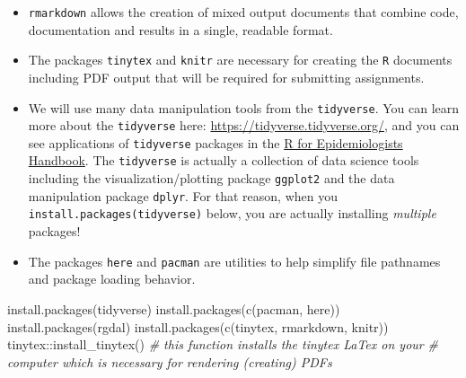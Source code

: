 \documentclass[
]{book}
\newenvironment{Shaded}{\begin{snugshade}}{\end{snugshade}}
\newcommand{\CommentTok}[1]{\textcolor[rgb]{0.56,0.35,0.01}{\textit{#1}}}
\newcommand{\FunctionTok}[1]{\textcolor[rgb]{0.00,0.00,0.00}{#1}}
\newcommand{\NormalTok}[1]{#1}
\newcommand{\SpecialCharTok}[1]{\textcolor[rgb]{0.00,0.00,0.00}{#1}}
\newcommand{\StringTok}[1]{\textcolor[rgb]{0.31,0.60,0.02}{#1}}
\providecommand{\tightlist}{%
  \setlength{\itemsep}{0pt}\setlength{\parskip}{0pt}}
\begin{document}
\begin{itemize}
\tightlist
\item
  \texttt{rmarkdown} allows the creation of mixed output documents that combine code, documentation and results in a single, readable format.
\item
  The packages \texttt{tinytex} and \texttt{knitr} are necessary for creating the \texttt{R} documents including PDF output that will be required for submitting assignments.
\item
  We will use many data manipulation tools from the \texttt{tidyverse}. You can learn more about the \texttt{tidyverse} here: \url{https://tidyverse.tidyverse.org/}, and you can see applications of \texttt{tidyverse} packages in the \href{https://epirhandbook.com/index.html}{R for Epidemiologists Handbook}. The \texttt{tidyverse} is actually a collection of data science tools including the visualization/plotting package \texttt{ggplot2} and the data manipulation package \texttt{dplyr}. For that reason, when you \texttt{install.packages(\textquotesingle{}tidyverse\textquotesingle{})} below, you are actually installing \emph{multiple} packages!
\item
  The packages \texttt{here} and \texttt{pacman} are utilities to help simplify file pathnames and package loading behavior.
\end{itemize}

\begin{Shaded}
\begin{Highlighting}[]
\FunctionTok{install.packages}\NormalTok{(}\StringTok{\textquotesingle{}tidyverse\textquotesingle{}}\NormalTok{)   }
\FunctionTok{install.packages}\NormalTok{(}\FunctionTok{c}\NormalTok{(}\StringTok{\textquotesingle{}pacman\textquotesingle{}}\NormalTok{, }\StringTok{\textquotesingle{}here\textquotesingle{}}\NormalTok{))}
\FunctionTok{install.packages}\NormalTok{(}\StringTok{\textquotesingle{}rgdal\textquotesingle{}}\NormalTok{)}
\FunctionTok{install.packages}\NormalTok{(}\FunctionTok{c}\NormalTok{(}\StringTok{\textquotesingle{}tinytex\textquotesingle{}}\NormalTok{, }\StringTok{\textquotesingle{}rmarkdown\textquotesingle{}}\NormalTok{, }\StringTok{\textquotesingle{}knitr\textquotesingle{}}\NormalTok{)) }
\NormalTok{tinytex}\SpecialCharTok{::}\FunctionTok{install\_tinytex}\NormalTok{()  }
\CommentTok{\# this function installs the tinytex LaTex on your}
\CommentTok{\#  computer which is necessary for rendering (creating) PDF\textquotesingle{}s }
\end{Highlighting}
\end{Shaded}
\end{document}
